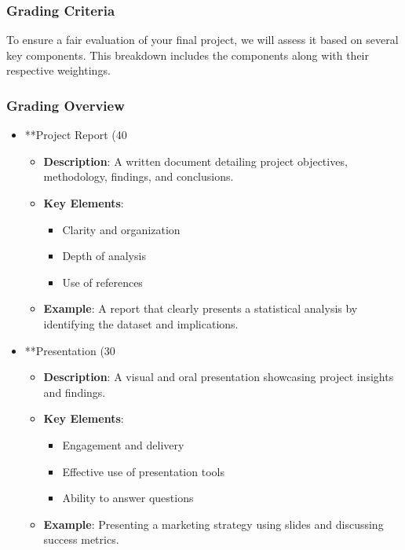 \documentclass{beamer}
\begin{document}
\begin{frame}[fragile]
    \frametitle{Grading Criteria}
    To ensure a fair evaluation of your final project, we will assess it based on several key components. This breakdown includes the components along with their respective weightings.
\end{frame}

\begin{frame}[fragile]
    \frametitle{Grading Overview}
    \begin{itemize}
        \item **Project Report (40%
            \begin{itemize}
                \item \textbf{Description}: A written document detailing project objectives, methodology, findings, and conclusions.
                \item \textbf{Key Elements}:
                \begin{itemize}
                    \item Clarity and organization
                    \item Depth of analysis
                    \item Use of references
                \end{itemize}
                \item \textbf{Example}: A report that clearly presents a statistical analysis by identifying the dataset and implications.
            \end{itemize}
        
        \item **Presentation (30%
            \begin{itemize}
                \item \textbf{Description}: A visual and oral presentation showcasing project insights and findings.
                \item \textbf{Key Elements}:
                \begin{itemize}
                    \item Engagement and delivery
                    \item Effective use of presentation tools
                    \item Ability to answer questions
                \end{itemize}
                \item \textbf{Example}: Presenting a marketing strategy using slides and discussing success metrics.
            \end{itemize}
    \end{itemize}
\end{frame}
\end{document}
